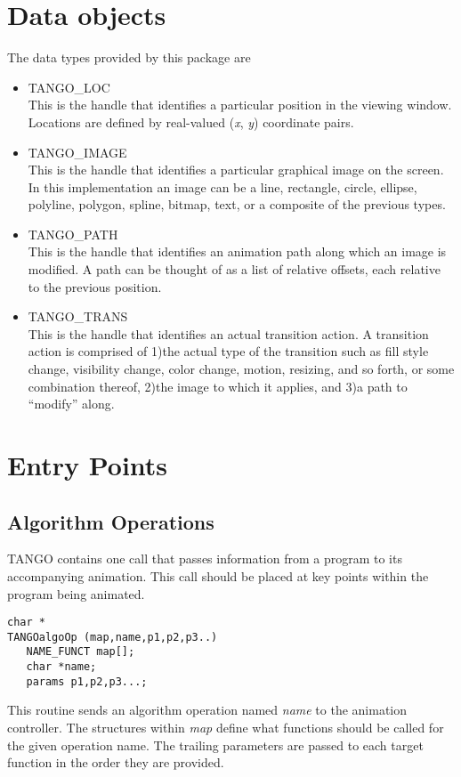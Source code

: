 \section{Data objects}
The data types provided by this package are
\begin{itemize}
\item TANGO\_LOC\\
This is the handle that identifies a particular position in the viewing
window.  Locations are defined by real-valued ({\em x}, {\em y}) coordinate
pairs.
\item TANGO\_IMAGE\\
This is the handle that identifies a particular graphical image on the
screen.  In this implementation an image can be a line, rectangle,
circle, ellipse, polyline, polygon, spline, bitmap, text, or a
composite of the previous types.
\item TANGO\_PATH\\
This is the handle that identifies an animation path along which an image
is modified.  A path can be thought of as a list of relative
offsets, each relative to the previous position.
\item TANGO\_TRANS\\
This is the handle that identifies an actual transition action.  A transition
action is comprised of 1)the actual type of the transition such as fill
style change, visibility change, color change, motion, resizing, and so forth,
or some combination thereof, 2)the image to which it applies, and 3)a path to
``modify'' along.
\end{itemize}

\section{Entry Points}
\subsection{Algorithm Operations}
TANGO contains one call that passes information from a program to its
accompanying animation.  This call should be placed at key points
within the program being animated.

\vspace{1em}
\begin{verbatim}
char *
TANGOalgoOp (map,name,p1,p2,p3..)
   NAME_FUNCT map[];
   char *name;
   params p1,p2,p3...;
\end{verbatim}
This routine sends an algorithm operation named {\em name} to the
animation controller.  The structures within {\em map} define what functions
should be called for the given operation name.  The trailing
parameters are passed to each target function in the order they are
provided.  

